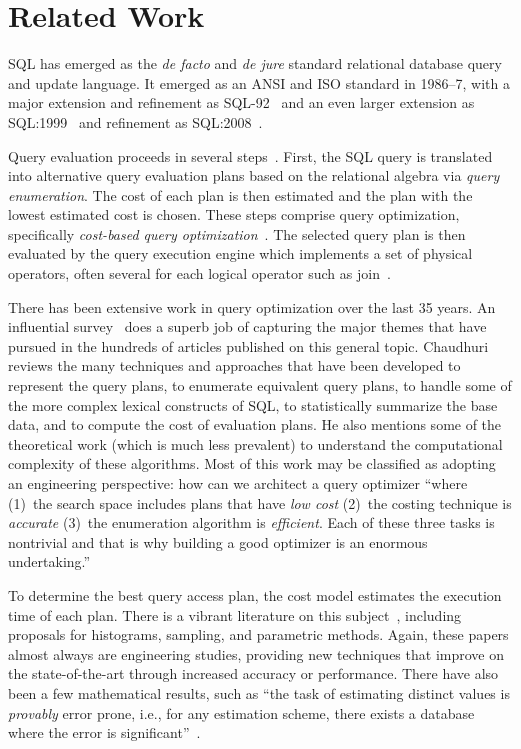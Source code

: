 \section{Related Work}\label{sec:related}


SQL has emerged as the {\em de facto} and {\em de jure} standard relational
database query and update language. It emerged as an ANSI and ISO standard
in 1986--7, with a major extension and refinement as SQL-92~\cite{Melton93} 
and an even larger extension as SQL:1999~\cite{Melton03} and refinement as
SQL:2008~\cite{SQL2008}. 

Query evaluation 
proceeds in several steps~\cite{Ramakrishnan03}. First, the SQL query is 
translated into alternative query evaluation plans based on the 
relational algebra via {\em query enumeration}. The cost
of each plan is then estimated and the plan with the lowest estimated cost
is chosen. These steps comprise query optimization, specifically {\em
cost-based query optimization}~\cite{Selinger}. The selected query plan is
then evaluated by the query execution engine which implements a set of
physical operators, often several for each logical operator such as
join~\cite{Graefe93}.

There has been extensive work in query optimization over the last 35
years. An influential survey~\cite{Chaudhuri98} does a superb job of
capturing the major themes that have pursued in the hundreds of articles
published on this general topic. Chaudhuri reviews the many techniques and
approaches that have been developed to represent the query plans, to
enumerate equivalent query plans, to handle some of the more complex lexical
constructs of SQL, to statistically summarize the base data, and to compute the
cost of evaluation plans. He also mentions some of the theoretical work
(which is much less prevalent) to understand the computational complexity of
these algorithms. Most of this work may be classified as adopting an
engineering perspective: how can we architect a query optimizer ``where 
(1)~the search space includes plans that have {\em low cost} (2)~the costing
technique is {\em accurate} (3)~the enumeration algorithm is {\em
  efficient}. Each of these three tasks is nontrivial and that is why
building a good optimizer is an enormous undertaking.'' \cite[page~35]{Chaudhuri98}

To determine the best query access plan, the cost model estimates the
execution time of each plan. There is a vibrant literature on this
subject~\hbox{\cite{Ioannidis03,Mannino88}}, including proposals for
histograms, sampling, and parametric methods. Again, these papers almost
always are engineering studies, providing new techniques that improve on the
state-of-the-art through increased accuracy or performance. There have also
been a few mathematical results, such as ``the task of estimating distinct
values is {\em provably} error prone, i.e., for any estimation scheme, there
exists a database where the error is significant''~\cite{Chaudhuri98}.

